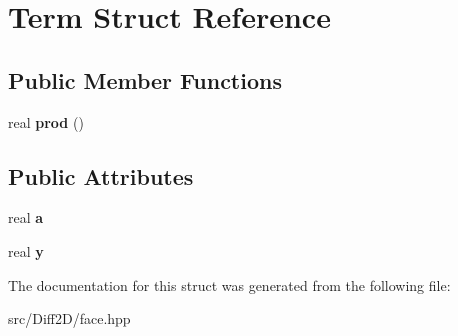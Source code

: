 \hypertarget{structTerm}{
\section{Term Struct Reference}
\label{structTerm}
}
\subsection*{Public Member Functions}
\begin{DoxyCompactItemize}
\item 
\hypertarget{structTerm_a90008c143070b0544ea0a5de0dd0d651}{
real {\bfseries prod} ()}
\label{structTerm_a90008c143070b0544ea0a5de0dd0d651}

\end{DoxyCompactItemize}
\subsection*{Public Attributes}
\begin{DoxyCompactItemize}
\item 
\hypertarget{structTerm_a5b8e26faad37a4317ce722efbb2fb345}{
real {\bfseries a}}
\label{structTerm_a5b8e26faad37a4317ce722efbb2fb345}

\item 
\hypertarget{structTerm_adc6281bf7884d8b213aa98a701b4e578}{
real {\bfseries y}}
\label{structTerm_adc6281bf7884d8b213aa98a701b4e578}

\end{DoxyCompactItemize}


The documentation for this struct was generated from the following file:\begin{DoxyCompactItemize}
\item 
src/Diff2D/face.hpp\end{DoxyCompactItemize}
